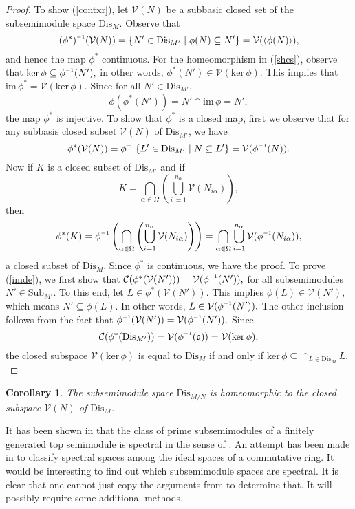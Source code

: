\documentclass[12pt,english]{smfart}
\newcommand{\inv}{^{\raisebox{.2ex}{$\scriptscriptstyle-1$}}}
\newtheorem{corollary}[theorem]{Corollary}
\theoremstyle{definition}
\begin{document}
\begin{proof}      
To show (\ref{contxr}), let $\mathcal{V}(N)$ be a   subbasic closed set of the subsemimodule  space $\mathrm{Dis}_M.$ Observe  that $$(\phi^*)\inv(\mathcal{V}(N)) =\{N'\in \mathrm{Dis}_{M'}\mid \phi(N)\subseteq N'\}=\mathcal{V}(\langle \phi(N)\rangle),$$ and hence the map $\phi^*$  continuous.     
For the homeomorphism in (\ref{shcs}), observe that     
$\mathrm{ker}\,\phi\subseteq \phi\inv(N'),$ in other words, $\phi^*(N')\in \mathcal{V}(\mathrm{ker}\,\phi)$. This implies that $\mathrm{im}\,\phi^*=\mathcal{V}(\mathrm{ker}\,\phi).$  
Since for all $N'\in \mathrm{Dis}_{M'},$ \[\phi(\phi^*(N'))=N'\cap \mathrm{im}\,\phi=N',\] the map $\phi^*$ is injective. To show that $\phi^*$ is a closed map, first we observe that for any subbasis closed subset  $\mathcal{V}(N)$ of  $\mathrm{Dis}_{M'}$, we have \[\phi^*(\mathcal{V}(N))=\phi\inv\{ L'\in \mathrm{Dis}_{M'}\mid N\subseteq   L'\}=\mathcal{V}(\phi\inv(N)).\]   Now if $K$ is a closed subset of $\mathrm{Dis}_{M'}$ and if \[K=\bigcap_{ \alpha \in \Omega} \left(\bigcup_{ i \,= 1}^{ n_{\alpha}} \mathcal{V}(N_{ i\alpha})\right),\] then \[\phi^*(K)=\phi\inv \left(\bigcap_{ \alpha \in \Omega} \left(\bigcup_{ i = 1}^{ n_{\alpha}} \mathcal{V}(N_{ i\alpha})\right)\right)=\bigcap_{ \alpha \in \Omega} \bigcup_{ i = 1}^{ n_{\alpha}} \mathcal{V}(\phi\inv(N_{ i\alpha})),\] a closed subset of  $\mathrm{Dis}_M.$ Since $\phi^*$ is   continuous, we have the proof.
To prove (\ref{imde}), we first show that $\mathcal{C}(\phi^*(\mathcal{V}(N')))=\mathcal{V}(\phi\inv(N')),$ for all subsemimodules $N'\in \mathrm{Sub}_{M'}.$ To this end, let $L\in \phi^*(\mathcal{V}(N')).$ This implies $\phi(L)\in \mathcal{V}(N'),$ which means $N'\subseteq \phi(L).$ In other words, $L\in \mathcal{V}(\phi\inv(N')).$ The other inclusion follows from the fact that $\phi\inv(\mathcal{V}(N'))=\mathcal{V}(\phi\inv(N')).$ Since $$\mathcal{C}(\phi^*(\mathrm{Dis}_{M'}))=\mathcal{V}(\phi\inv(\mathfrak{o}))=\mathcal{V}(\mathrm{ker}\,\phi),$$ the closed subspace $\mathcal{V}(\mathrm{ker}\,\phi)$ is equal to $\mathrm{Dis}_M$ if and only if $\mathrm{ker}\,\phi\subseteq \cap_{L\in \mathrm{Dis}_M}L.$     
\end{proof}    

\begin{corollary}
The subsemimodule space $\mathrm{Dis}_{M/N}$ is homeomorphic to the closed subspace
$\mathcal{V}(N)$ of $\mathrm{Dis}_M$.   
\end{corollary}

It has been shown in \cite{HPH21} that the class of prime subsemimodules of a finitely generated top semimodule is spectral in the sense of \cite{H69}. An attempt has been made in \cite{FGS22} to classify spectral spaces among the ideal spaces of a commutative ring. It would be interesting to find out which subsemimodule spaces are spectral. It is clear that one cannot just copy the arguments from \cite{FGS22} to determine that. It will possibly require some additional methods.
\end{document}
